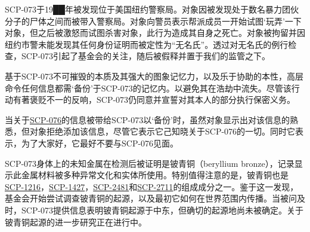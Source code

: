 SCP-073于19██年被发现位于美国纽约警察局。对象因被发现处于数名暴力团伙分子的尸体之间而被带入警察局。对象向警员表示帮派成员一开始试图‘玩弄’一下对象，但之后被激怒而试图杀害对象，此行为造成其自身之死亡。对象被拘留并因纽约市警未能发现其任何身份证明而被定性为“无名氏”。透过对无名氏的例行检查，SCP-073引起了基金会的关注，随后被假释并置于我们的监管之下。

基于SCP-073不可摧毁的本质及其强大的图象记忆力，以及乐于协助的本性，高层命令任何信息都需‘备份’于SCP-073的记忆内。以避免其在浩劫中流失。尽管该行动有著褒贬不一的反响，SCP-073仍同意并宣誓对其本人的部分执行保密义务。

当关于\hyperref[chap:SCP-076]{SCP-076}的信息被带给SCP-073以‘备份’时，虽然对象显示出对该信息的熟悉，但对象拒绝添加该信息，尽管它表示它己知晓关于SCP-076的一切。同时它表示，为了大家好，它最好不要与SCP-076见面。

SCP-073身体上的未知金属在检测后被证明是铍青铜（beryllium bronze），记录显示此金属材料被多种异常文化和实体所使用。特别值得注意的是，铍青铜也是\hyperref[chap:SCP-1216]{SCP-1216}，\hyperref[chap:SCP-1427]{SCP-1427}，\hyperref[chap:SCP-2481]{SCP-2481}和\hyperref[chap:SCP-2711]{SCP-2711}的组成成分之一。鉴于这一发现，基金会开始尝试调查铍青铜的起源，以及最初它如何在世界范围内传播。当被问及时，SCP-073提供信息表明铍青铜起源于中东，但确切的起源地尚未被确定。关于铍青铜起源的进一步研究正在进行中。
